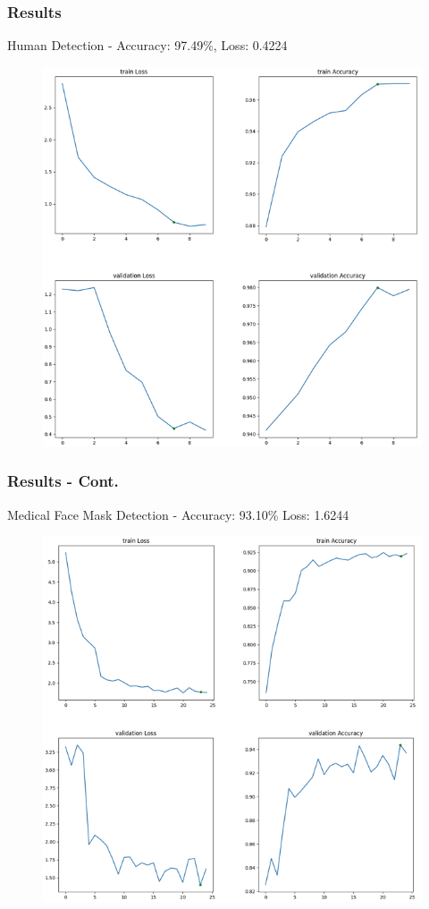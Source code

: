 \begin{frame}
    \frametitle{Results}
    Human Detection - Accuracy: 97.49\%, Loss: 0.4224
    \begin{figure}[H]
        \centering
        \includegraphics[scale=0.35]{images/report/HumanGraphs}
    \end{figure}
\end{frame}

\begin{frame}
    \frametitle{Results - Cont.}
    Medical Face Mask Detection - Accuracy: 93.10\% Loss: 1.6244
    \begin{figure}[H]
        \centering
        \includegraphics[scale=0.35]{images/report/FaceMaskGraphs}
    \end{figure}
\end{frame}

